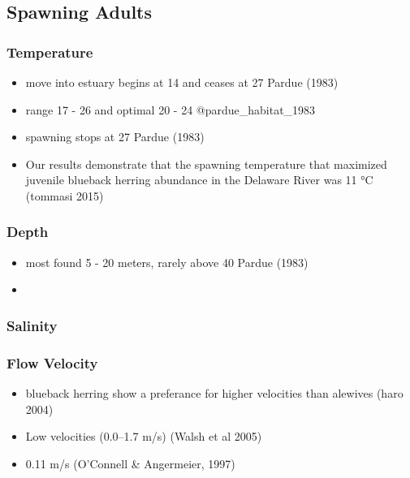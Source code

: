 \documentclass[
]{book}
\providecommand{\tightlist}{%
  \setlength{\itemsep}{0pt}\setlength{\parskip}{0pt}}
\begin{document}
\hypertarget{spawning-adults}{%
\subsection{Spawning Adults}\label{spawning-adults}}

\hypertarget{temperature-6}{%
\subsubsection{Temperature}\label{temperature-6}}

\begin{itemize}
\item
  move into estuary begins at 14 and ceases at 27 Pardue (1983)
\item
  range 17 - 26 and optimal 20 - 24 @pardue\_habitat\_1983
\item
  spawning stops at 27 Pardue (1983)
\item
  Our results demonstrate that the spawning temperature that maximized juvenile blueback herring abundance in the Delaware River was 11 °C (tommasi 2015)
\end{itemize}

\hypertarget{depth-6}{%
\subsubsection{Depth}\label{depth-6}}

\begin{itemize}
\item
  most found 5 - 20 meters, rarely above 40 Pardue (1983)
\item
\end{itemize}

\hypertarget{salinity-6}{%
\subsubsection{Salinity}\label{salinity-6}}

\hypertarget{flow-velocity-6}{%
\subsubsection{Flow Velocity}\label{flow-velocity-6}}

\begin{itemize}
\tightlist
\item
  blueback herring show a preferance for higher velocities than alewives (haro 2004)
\item
  Low velocities (0.0--1.7 m/s) (Walsh et al 2005)
\item
  0.11 m/s (O'Connell \& Angermeier, 1997)
\end{itemize}
\end{document}

